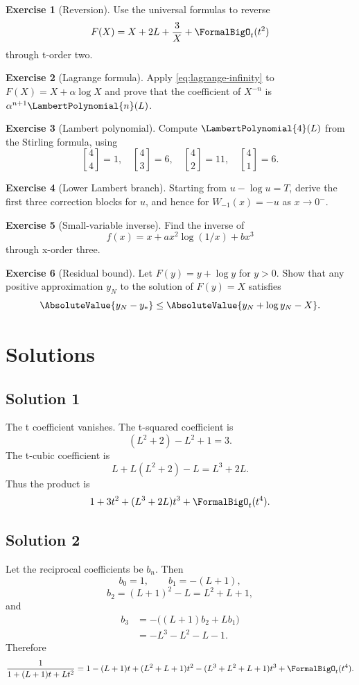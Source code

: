 \documentclass[11pt,openany]{book}
\theoremstyle{definition}
\newtheorem{exercise}{Exercise}[chapter]
\theoremstyle{plain}
\theoremstyle{remark}
\newcommand{\stirlingone}[2]{\genfrac{[}{]}{0pt}{}{#1}{#2}}
\begin{document}
\begin{exercise}[Reversion]
Use the universal formulas to reverse
\[
 F(X)=X+2L+\frac3X+\FormalBigO_t(t^2)
\]
through t-order two.
\end{exercise}

\begin{exercise}[Lagrange formula]
Apply \cref{eq:lagrange-infinity} to \(F(X)=X+\alpha\log X\) and prove that the
coefficient of \(X^{-n}\) is \(\alpha^{n+1}\LambertPolynomial{n}(L)\).
\end{exercise}

\begin{exercise}[Lambert polynomial]
Compute \(\LambertPolynomial{4}(L)\) from the Stirling formula, using
\[
 \stirlingone{4}{4}=1,
 \quad \stirlingone{4}{3}=6,
 \quad \stirlingone{4}{2}=11,
 \quad \stirlingone{4}{1}=6.
\]
\end{exercise}

\begin{exercise}[Lower Lambert branch]
Starting from \(u-\log u=T\), derive the first three correction blocks for
\(u\), and hence for \(W_{-1}(x)=-u\) as \(x\to0^-\).
\end{exercise}

\begin{exercise}[Small-variable inverse]
Find the inverse of
\[
 f(x)=x+a x^2\log(1/x)+b x^3
\]
through x-order three.
\end{exercise}

\begin{exercise}[Residual bound]
Let \(F(y)=y+\log y\) for \(y>0\).  Show that any positive approximation
\(y_N\) to the solution of \(F(y)=X\) satisfies
\[
 \AbsoluteValue{y_N-y_*}\le\AbsoluteValue{y_N+\log y_N-X}.
\]
\end{exercise}

\section{Solutions}

\subsection*{Solution 1}
The t coefficient vanishes.  The t-squared coefficient is
\[
 (L^2+2)-L^2+1=3.
\]
The t-cubic coefficient is
\[
 L+L(L^2+2)-L=L^3+2L.
\]
Thus the product is
\[
 1+3t^2+(L^3+2L)t^3+\FormalBigO_t(t^4).
\]

\subsection*{Solution 2}
Let the reciprocal coefficients be \(b_n\).  Then
\[
 b_0=1,
 \qquad b_1=-(L+1),
\]
\[
 b_2=(L+1)^2-L=L^2+L+1,
\]
and
\begin{align*}
 b_3&=-\bigl((L+1)b_2+Lb_1\bigr)\\
 &=-L^3-L^2-L-1.
\end{align*}
Therefore
\[
 \frac1{1+(L+1)t+Lt^2}
 =1-(L+1)t+(L^2+L+1)t^2
 -(L^3+L^2+L+1)t^3+\FormalBigO_t(t^4).
\]
\end{document}
